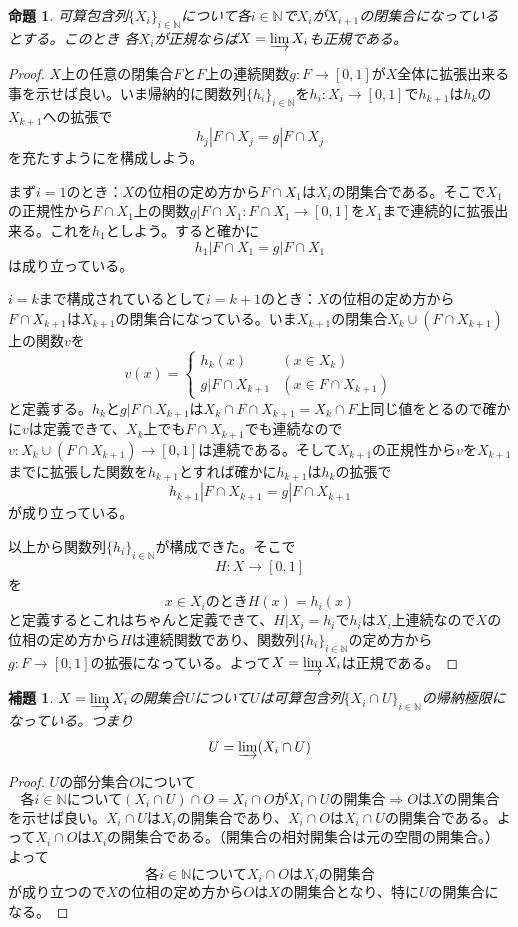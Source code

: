 \documentclass[leqno]{jsarticle}
\newtheorem{prop}[thm]{命題}
\newtheorem{lem}[thm]{補題}
\newcommand{\To}{\Longrightarrow}
\newcommand{\nn}{\mathbb{N}}
\begin{document}
\begin{prop}\label{seiki2}
可算包含列$\{X_i\}_{i\in \nn}$について各$i\in \nn$で$X_i$が$X_{i+1}$の閉集合になっているとする。このとき
各$X_i$が正規ならば$X=\varinjlim X_i$も正規である。
\end{prop}
\begin{proof}
$X$上の任意の閉集合$F$と$F$上の連続関数$g:F\to [0,1]$が$X$全体に拡張出来る事を示せば良い。いま帰納的に関数列$\{h_i\}_{i\in \nn}$を$h_i:X_i\to [0,1]$で$h_{k+1}$は$h_k$の$X_{k+1}$への拡張で
\[
h_j|F\cap X_j=g|F\cap X_j
\]
を充たすようにを構成しよう。\par
まず$i=1$のとき：$X$の位相の定め方から$F\cap X_1$は$X_i$の閉集合である。そこで$X_1$の正規性から$F\cap X_1$上の関数$g|F\cap X_1:F\cap X_1\to[0,1]$を$X_1$まで連続的に拡張出来る。これを$h_1$としよう。すると確かに
\[
h_1|F\cap X_1=g|F\cap X_1
\]は成り立っている。\par
$i=k$まで構成されているとして$i=k+1$のとき：$X$の位相の定め方から$F\cap X_{k+1}$は$X_{k+1}$の閉集合になっている。いま$X_{k+1}$の閉集合$X_k\cup (F\cap X_{k+1})$上の関数$v$を
\[
v(x)=
\begin{cases}
h_k(x) & \text{$(x\in X_k)$}\\
g|F\cap X_{k+1} & \text{$(x\in F\cap X_{k+1})$}
\end{cases}
\]
と定義する。$h_k$と$g|F\cap X_{k+1}$は$X_k\cap F\cap X_{k+1}=X_k\cap F$上同じ値をとるので確かに$v$は定義できて、$X_k$上でも$F\cap X_{k+1}$でも連続なので$v:X_k\cup (F\cap X_{k+1})\to [0,1]$は連続である。そして$X_{k+1}$の正規性から$v$を$X_{k+1}$までに拡張した関数を$h_{k+1}$とすれば確かに$h_{k+1}$は$h_k$の拡張で
\[
h_{k+1}|F\cap X_{k+1}=g|F\cap X_{k+1}
\]
が成り立っている。\par
以上から関数列$\{h_i\}_{i\in \nn}$が構成できた。そこで
\[
H:X\to [0,1]
\]
を
\[
\mbox{$x\in X_i$のとき$H(x)=h_i(x)$}
\]
と定義するとこれはちゃんと定義できて、$H|X_i=h_i$で$h_i$は$X_i$上連続なので$X$の位相の定め方から$H$は連続関数であり、関数列$\{h_i\}_{i\in \nn}$の定め方から$g:F\to [0,1]$の拡張になっている。よって$X=\varinjlim X_i$は正規である。
\end{proof}

\begin{lem}\label{open}
$X=\varinjlim X_i$の開集合$U$について$U$は可算包含列$\{X_i\cap U\}_{i\in \nn}$の帰納極限になっている。つまり
\[
U=\varinjlim (X_i\cap U)
\]
\end{lem}
\begin{proof}$U$の部分集合$O$について
\[
\mbox{各$i\in \nn$について$(X_i\cap U)\cap O=X_i\cap O$が$X_i\cap U$の開集合}\To \mbox{$O$は$X$の開集合}
\]
を示せば良い。$X_i\cap U$は$X_i$の開集合であり、$X_i\cap O$は$X_i\cap U$の開集合である。よって$X_i\cap O$は$X_i$の開集合である。（開集合の相対開集合は元の空間の開集合。）よって
\[
\mbox{各$i\in \nn$について$X_i\cap O$は$X_i$の開集合}
\]
が成り立つので$X$の位相の定め方から$O$は$X$の開集合となり、特に$U$の開集合になる。
\end{proof}
\end{document}

